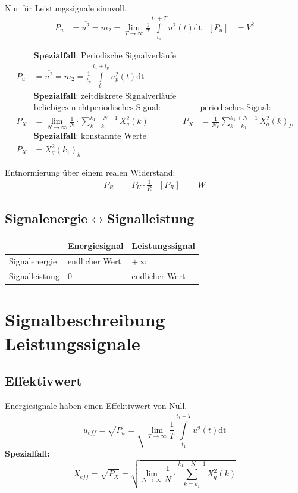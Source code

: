 Nur für Leistungssignale sinnvoll.
\begin{align*}
	P_u &= \overline{u^2} = m_2 = \lim\limits_{T \to \infty} \frac{1}{T} \int\limits_{t_1}^{t_1 +
	T}u^2\left(t\right) \mathrm{dt} & \left[P_u\right] &= V^2
\end{align*}

\begin{align*}
	&\textbf{Spezialfall: } \text{Periodische Signalverläufe}
	\\
	P_u &= \overline{u^2} = m_2 = \frac{1}{t_p} \int\limits_{t_1}^{t_1 + t_p}u^2_p\left(t\right)
	\mathrm{dt}
	\\
&\textbf{Spezialfall: } \text{zeitdiskrete Signalverläufe}
	\\
	&\text{beliebiges nichtperiodisches Signal:} & &\text{periodisches Signal:}
	\\
	P_X &= \lim\limits_{N \to \infty} \frac{1}{N} \cdot \sum\limits_{k = k_1}^{k_1 +
	N - 1} X_q^2\left(k\right) &
	P_X &= \frac{1}{N_P} \sum\limits_{k = k_1}^{k_1 + N - 1}X_q^2\left(k\right)_P
	\\
&\textbf{Spezialfall: } \text{konstannte Werte}
	\\
	P_X &= X^2_q\left(k_1\right)_k
\end{align*}

Entnormierung über einem realen Widerstand:
\begin{align*}
	P_R &= P_U \cdot \frac{1}{R} & \left[P_R\right] &= W
\end{align*}

\subsection*{Signalenergie\texorpdfstring{$\leftrightarrow$}/Signalleistung}
\begin{tabularx}{\textwidth}{|X|X|X|}\hline
					& Energiesignal 	& Leistungssignal	\\ \hline
	Signalenergie	& endlicher Wert	& \(+\infty\)		\\ \hline
	Signalleistung	& \(0\)				& endlicher Wert	\\ \hline
\end{tabularx}

\section{Signalbeschreibung Leistungssignale}
\subsection*{Effektivwert}
Energiesignale haben einen Effektivwert von Null.
\[
u_{eff} = \sqrt{P_u} = \sqrt{\lim\limits_{T \to \infty} \frac{1}{T} \int\limits_{t_1}^{t_1 +
	T}u^2\left(t\right) \mathrm{dt}}
\]
\textbf{Spezialfall: } 
\[
X_{eff} = \sqrt{P_X} = \sqrt{\lim\limits_{N \to \infty} \frac{1}{N} \cdot \sum\limits_{k = k_1}^{k_1 +
	N - 1} X_q^2\left(k\right)}
\]

